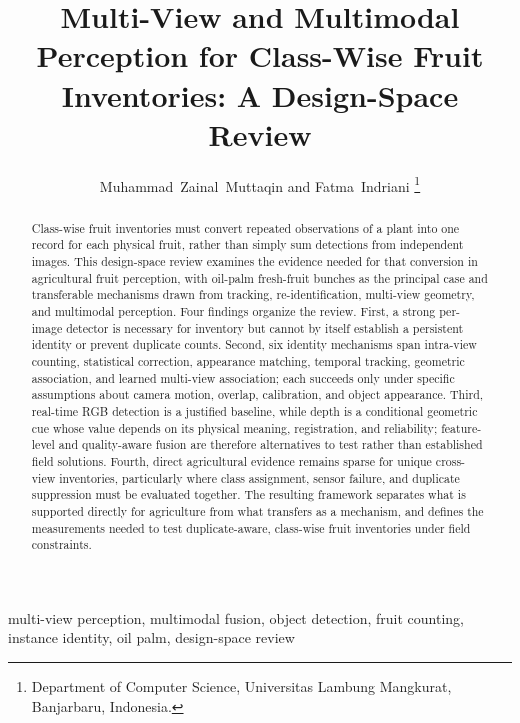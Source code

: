\documentclass[journal]{IEEEtran}
\begin{document}
\title{Multi-View and Multimodal Perception for Class-Wise Fruit Inventories: A Design-Space Review}
\author{Muhammad~Zainal~Muttaqin and Fatma~Indriani%
\thanks{Department of Computer Science, Universitas Lambung Mangkurat, Banjarbaru, Indonesia.}}
\maketitle
\begin{abstract}
Class-wise fruit inventories must convert repeated observations of a plant into
one record for each physical fruit, rather than simply sum detections from
independent images. This design-space review examines the evidence needed for
that conversion in agricultural fruit perception, with oil-palm fresh-fruit
bunches as the principal case and transferable mechanisms drawn from tracking,
re-identification, multi-view geometry, and multimodal perception. Four
findings organize the review. First, a strong per-image detector is necessary
for inventory but cannot by itself establish a persistent identity or prevent
duplicate counts. Second, six identity mechanisms span intra-view counting,
statistical correction, appearance matching, temporal tracking, geometric
association, and learned multi-view association; each succeeds only under
specific assumptions about camera motion, overlap, calibration, and object
appearance. Third, real-time RGB detection is a justified baseline, while
depth is a conditional geometric cue whose value depends on its physical
meaning, registration, and reliability; feature-level and quality-aware fusion
are therefore alternatives to test rather than established field solutions.
Fourth, direct agricultural evidence remains sparse for unique cross-view
inventories, particularly where class assignment, sensor failure, and duplicate
suppression must be evaluated together. The resulting framework separates what
is supported directly for agriculture from what transfers as a mechanism, and
defines the measurements needed to test duplicate-aware, class-wise fruit
inventories under field constraints.
\end{abstract}
\begin{IEEEkeywords}
multi-view perception, multimodal fusion, object detection, fruit counting,
instance identity, oil palm, design-space review
\end{IEEEkeywords}



\end{document}
